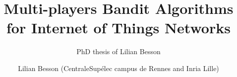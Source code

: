 \documentclass[a4paper,12pt,twoside,index,PageStyleII,print]{0-Misc/PhDThesisPSnPDF}
\title{Multi-players Bandit Algorithms for Internet of Things Networks}
\subtitle{PhD thesis of Lilian Besson}
\author{Lilian Besson (CentraleSupélec campus de Rennes and Inria Lille)}
\begin{document}
	\frontmatter
	

	\begin{spacing}{1}
		\dominitoc
		\tableofcontents
	\end{spacing}

	\mainmatter

	

	

	\newpage

	\begin{small}   %

	\begin{spacing}{0.93}
		
		\printnomenclature[8em]
		\label{chapter:nomenclature}
	\end{spacing}

	\begin{spacing}{1.00}
		\listoffigures
		\listofalgorithms
		\listoflistings
		\listoftables
	\end{spacing}

	\begin{spacing}{0.93}
		
		\cleardoublepage
		
	\end{spacing}

	\end{small}   %


	\backmatter
	\cleartoleftpage

	\newpage
	
\end{document}
